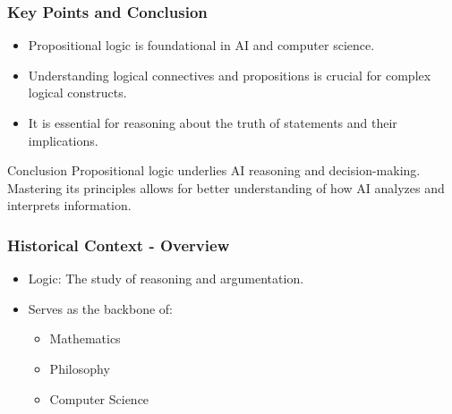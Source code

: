 \documentclass[aspectratio=169]{beamer}
\begin{document}
\begin{frame}[fragile]
    \frametitle{Key Points and Conclusion}
    \begin{itemize}
        \item Propositional logic is foundational in AI and computer science.
        \item Understanding logical connectives and propositions is crucial for complex logical constructs.
        \item It is essential for reasoning about the truth of statements and their implications.
    \end{itemize}

    \begin{block}{Conclusion}
        Propositional logic underlies AI reasoning and decision-making. Mastering its principles allows for better understanding of how AI analyzes and interprets information.
    \end{block}
\end{frame}

\begin{frame}[fragile]
    \frametitle{Historical Context - Overview}
    \begin{itemize}
        \item Logic: The study of reasoning and argumentation.
        \item Serves as the backbone of:
        \begin{itemize}
            \item Mathematics
            \item Philosophy
            \item Computer Science
        \end{itemize}
    \end{itemize}
\end{frame}
\end{document}
